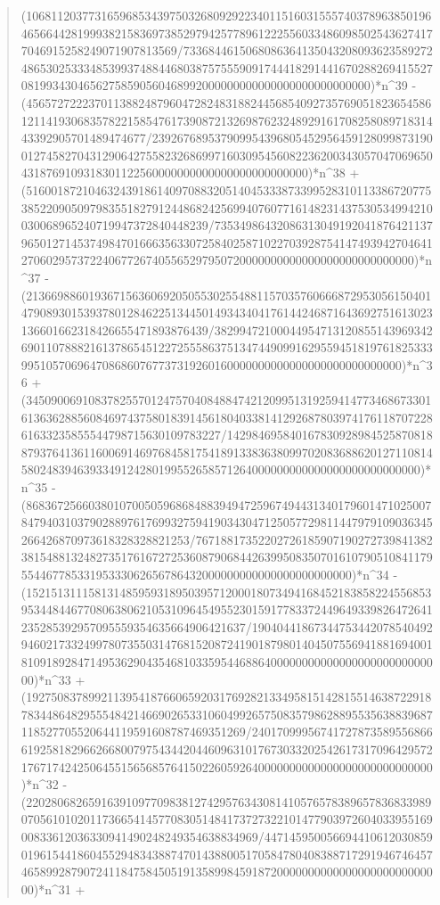 \documentclass[11pt,a4paper]{article}
\theoremstyle{plain}
\theoremstyle{definition}
\begin{document}
\begin{quote}
(106811203773165968534397503268092922340115160315557403789638501964656644281999382158369738529794257789612225560334860985025436274177046915258249071907813569/733684461506808636413504320809362358927248653025333485399374884468038757555909174441829144167028826941552708199343046562758590560468992000000000000000000000000000)*n\^{}39 - (4565727222370113882487960472824831882445685409273576905182365458612114193068357822158547617390872132698762324892916170825808971831443392905701489474677/2392676895379099543968054529564591280998731900127458270431290642755823268699716030954560822362003430570470696504318769109318301122560000000000000000000000000)*n\^{}38 + (51600187210463243918614097088320514045333873399528310113386720775385220905097983551827912448682425699407607716148231437530534994210030068965240719947372840448239/73534986432086313049192041876421137965012714537498470166635633072584025871022703928754147493942704641270602957372240677267405565297950720000000000000000000000000000)*n\^{}37 - (21366988601936715636069205055302554881157035760666872953056150401479089301539378012846225134450149343404176144246871643692751613023136601662318426655471893876439/382994721000449547131208551439693426901107888216137865451227255586375134744909916295594518197618253339951057069647086860767737319260160000000000000000000000000000)*n\^{}36 + (3450900691083782557012475704084884742120995131925941477346867330161363628856084697437580183914561804033814129268780397417611870722861633235855544798715630109783227/1429846958401678309289845258708188793764136116006914697684581754189133836380997020836886201271108145802483946393349124280199552658571264000000000000000000000000000)*n\^{}35 - (86836725660380107005059686848839494725967494431340179601471025007847940310379028897617699327594190343047125057729811447979109036345266426870973618328328821253/7671881735220272618590719027273984138238154881324827351761672725360879068442639950835070161079051084117955446778533195333062656786432000000000000000000000000)*n\^{}34 - (15215131115813148595931895039571200018073494168452183858224556853953448446770806380621053109645495523015917783372449649339826472641235285392957095559354635664906421637/1904044186734475344207854049294602173324997807355031476815208724190187980140450755694188169400181091892847149536290435468103359544688640000000000000000000000000000)*n\^{}33 + (19275083789921139541876606592031769282133495815142815514638722918783448648295554842146690265331060499265750835798628895535638839687118527705520644119591608787469351269/24017099956741727873589556866619258182966266800797543442044609631017673033202542617317096429572176717424250645515656857641502260592640000000000000000000000000000)*n\^{}32 - (2202806826591639109770983812742957634308141057657838965783683398907056101020117366541457708305148417372732210147790397260403395516900833612036330941490248249354638834969/44714595005669441061203085901961544186045529483438874701438800517058478040838871729194674645746589928790724118475845051913589984591872000000000000000000000000000)*n\^{}31 + 
\end{quote}
\end{document}
